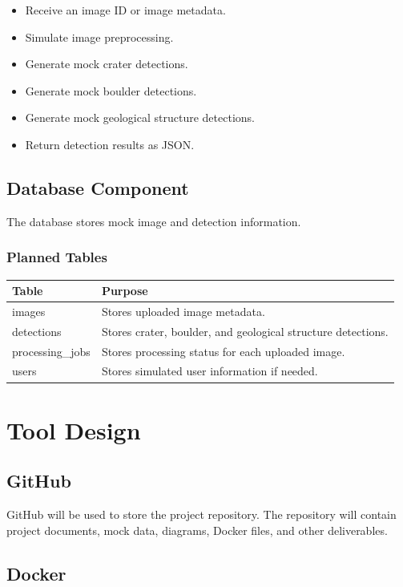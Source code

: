 \documentclass[12pt]{article}
\begin{document}
\begin{itemize}
    \item Receive an image ID or image metadata.
    \item Simulate image preprocessing.
    \item Generate mock crater detections.
    \item Generate mock boulder detections.
    \item Generate mock geological structure detections.
    \item Return detection results as JSON.
\end{itemize}

\subsection{Database Component}

The database stores mock image and detection information.

\subsubsection{Planned Tables}

\begin{longtable}{|p{1.7in}|p{4.3in}|}
\hline
\textbf{Table} & \textbf{Purpose} \\
\hline
images & Stores uploaded image metadata. \\
\hline
detections & Stores crater, boulder, and geological structure detections. \\
\hline
processing\_jobs & Stores processing status for each uploaded image. \\
\hline
users & Stores simulated user information if needed. \\
\hline
\end{longtable}

\section{Tool Design}

\subsection{GitHub}

GitHub will be used to store the project repository. The repository will contain project documents, mock data, diagrams, Docker files, and other deliverables.

\subsection{Docker}
\end{document}
